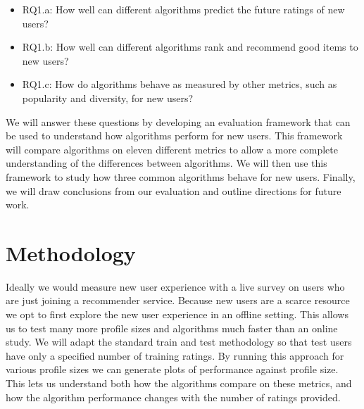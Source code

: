 \documentclass[letterpaper]{sig-alternate}
\begin{document}
      
  \begin{itemize}
  \item RQ1.a: How well can different algorithms predict the future ratings of new users?
  \item RQ1.b: How well can different algorithms rank and recommend good items to new users?
  \item RQ1.c: How do algorithms behave as measured by other metrics, such as popularity and diversity, for new users?
  \end{itemize}

  We will answer these questions by developing an evaluation framework that can be used to understand how algorithms perform for new users.
  This framework will compare algorithms on eleven different metrics to allow a more complete understanding of the differences between algorithms.
  We will then use this framework to study how three common algorithms behave for new users.
  Finally, we will draw conclusions from our evaluation and outline directions for future work.

\section{Methodology}
\label{sec:methodology}

  Ideally we would measure new user experience with a live survey on users who are just joining a recommender service.
  Because new users are a scarce resource we opt to first explore the new user experience in an offline setting.
  This allows us to test many more profile sizes and algorithms much faster than an online study.
  We will adapt the standard train and test methodology so that test users have only a specified number of training ratings.
  By running this approach for various profile sizes we can generate plots of performance against profile size.
  This lets us understand both how the algorithms compare on these metrics, and how the algorithm performance changes with the number of ratings provided.
\end{document}
